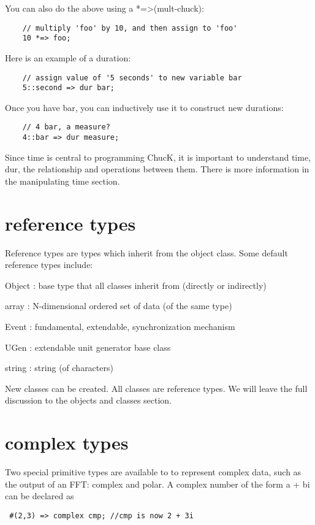 You can also do the above using a *=\textgreater (mult-chuck):
\begin{verbatim}
    // multiply 'foo' by 10, and then assign to 'foo'
    10 *=> foo;
\end{verbatim}

Here is an example of a duration:
\begin{verbatim}
    // assign value of '5 seconds' to new variable bar
    5::second => dur bar;
\end{verbatim}

Once you have bar, you can inductively use it to construct new durations:
\begin{verbatim}
    // 4 bar, a measure?
    4::bar => dur measure;
\end{verbatim}

 Since time is central to programming ChucK, it is important to understand time, dur, the relationship and operations between them. There is more information in the manipulating time section.
 
\section{reference types}

Reference types are types which inherit from the object class. Some default reference types include:
\begin{chuckitemize}
\item  Object : base type that all classes inherit from (directly or indirectly)
\item  array : N-dimensional ordered set of data (of the same type)
\item  Event : fundamental, extendable, synchronization mechanism
\item  UGen : extendable unit generator base class
\item  string : string (of characters)
\end{chuckitemize}
 New classes can be created. All classes are reference types. We will leave the full discussion to the objects and classes section.

\section{complex types}

Two special primitive types are available to to represent complex data, such as
the output of an FFT: complex and polar. A complex number of the form a + bi can
be declared as
\begin{verbatim}
 #(2,3) => complex cmp; //cmp is now 2 + 3i
\end{verbatim}

